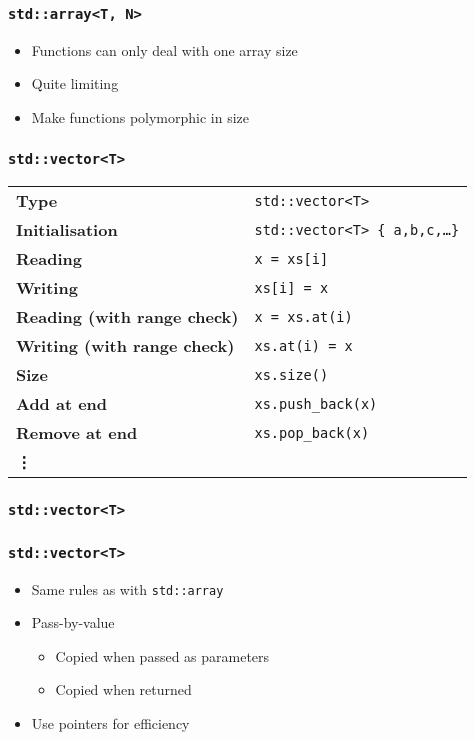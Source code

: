 \documentclass{../ucll-slides}
\begin{document}
\begin{frame}
  \frametitle{\tt std::array<T, N>}
  \begin{itemize}
    \item Functions can only deal with one array size
    \item Quite limiting
    \item Make functions polymorphic in size
  \end{itemize}
\end{frame}

\begin{frame}
  \frametitle{\tt std::vector<T>}
  \begin{center}
    \begin{tabular}{ll}
      \bf Type & {\tt std::vector<T>} \\[2mm]
      \bf Initialisation & {\tt std::vector<T> \{ a,b,c,\dots \}} \\[2mm]
      \bf Reading & {\tt x = xs[i]} \\[2mm]
      \bf Writing & {\tt xs[i] = x} \\[2mm]
      \bf Reading (with range check) & {\tt x = xs.at(i)} \\[2mm]
      \bf Writing (with range check) & {\tt xs.at(i) = x} \\[2mm]
      \bf Size & {\tt xs.size()} \\[2mm]
      \bf Add at end & {\tt xs.push\_back(x)} \\[2mm]
      \bf Remove at end & {\tt xs.pop\_back(x)} \\[2mm]
      \bf \vdots
    \end{tabular}
  \end{center}
\end{frame}

\begin{frame}
  \frametitle{\tt std::vector<T>}
\end{frame}

\begin{frame}
  \frametitle{\tt std::vector<T>}
  \begin{itemize}
    \item Same rules as with {\tt std::array}
    \item Pass-by-value
          \begin{itemize}
            \item Copied when passed as parameters \cake
            \item Copied when returned \cake
          \end{itemize}
    \item Use pointers for efficiency
  \end{itemize}
\end{frame}
\end{document}
